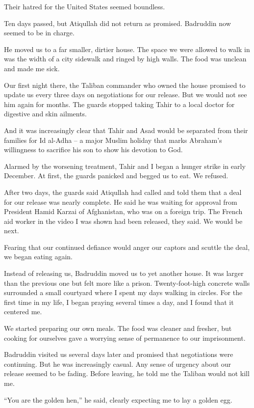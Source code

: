 ﻿\documentclass[12pt]{article}
\begin{document}
Their hatred for the United States seemed boundless.

Ten days passed, but Atiqullah did not return as promised. Badruddin now seemed to be in charge.

He moved us to a far smaller, dirtier house. The space we were allowed to walk in was the width of a
city sidewalk and ringed by high walls. The food was unclean and made me sick.

Our first night there, the Taliban commander who owned the house promised to update us every three
days on negotiations for our release. But we would not see him again for months. The guards stopped
taking Tahir to a local doctor for digestive and skin ailments.

And it was increasingly clear that Tahir and Asad would be separated from their families for Id
al-Adha -- a major Muslim holiday that marks Abraham's willingness to sacrifice his son to show his
devotion to God.

Alarmed by the worsening treatment, Tahir and I began a hunger strike in early December. At first,
the guards panicked and begged us to eat. We refused.

After two days, the guards said Atiqullah had called and told them that a deal for our release was
nearly complete. He said he was waiting for approval from President Hamid Karzai of Afghanistan, who
was on a foreign trip. The French aid worker in the video I was shown had been released, they said.
We would be next.

Fearing that our continued defiance would anger our captors and scuttle the deal, we began eating
again.

Instead of releasing us, Badruddin moved us to yet another house. It was larger than the previous
one but felt more like a prison. Twenty-foot-high concrete walls surrounded a small courtyard where
I spent my days walking in circles. For the first time in my life, I began praying several times a
day, and I found that it centered me.

We started preparing our own meals. The food was cleaner and fresher, but cooking for ourselves gave
a worrying sense of permanence to our imprisonment.

Badruddin visited us several days later and promised that negotiations were continuing. But he was
increasingly casual. Any sense of urgency about our release seemed to be fading. Before leaving, he
told me the Taliban would not kill me.

``You are the golden hen,'' he said, clearly expecting me to lay a golden egg.
\end{document}
